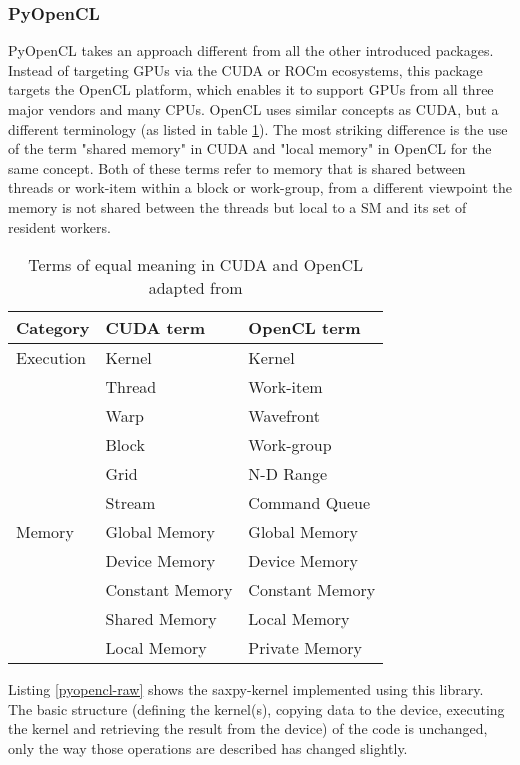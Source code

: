 \documentclass[english,11pt,a4paper,table]{article} %
\begin{document}
\subsubsection{PyOpenCL}

PyOpenCL takes an approach different from all the other introduced packages.
Instead of targeting GPUs via the CUDA or ROCm ecosystems, this package targets the OpenCL platform, which enables it to support GPUs from all three major vendors and many CPUs.
OpenCL uses similar concepts as CUDA, but a different terminology (as listed in table \ref{CUDA-OPENCL-Terminoloy}).
The most striking difference is the use of the term "shared memory" in CUDA and "local memory" in OpenCL for the same concept.
Both of these terms refer to memory that is shared between threads or work-item within a block or work-group, from a different viewpoint the memory is not shared between the threads but local to a SM and its set of resident workers.

\begin{table}[H]
	\centering
	\begin{tabular}{l|ll} \toprule
		Category  & CUDA term       & OpenCL term     \\ \midrule
		Execution & Kernel          & Kernel          \\
		{}        & Thread          & Work-item       \\
		{}        & Warp            & Wavefront       \\
		{}        & Block           & Work-group      \\
		{}        & Grid            & N-D Range       \\
		{}        & Stream          & Command Queue   \\ \midrule
		Memory    & Global Memory   & Global Memory   \\
		{}        & Device Memory   & Device Memory   \\
		{}        & Constant Memory & Constant Memory \\
		{}        & Shared Memory   & Local Memory    \\
		{}        & Local Memory    & Private Memory  \\
		\bottomrule
	\end{tabular}
	\caption{Terms of equal meaning in CUDA and OpenCL adapted from \cite{HARVEY20111093}}
	\label{CUDA-OPENCL-Terminoloy}
\end{table}

Listing \ref{pyopencl-raw} shows the saxpy-kernel implemented using this library.
The basic structure (defining the kernel(s), copying data to the device, executing the kernel and retrieving the result from the device) of the code is unchanged, only the way those operations are described has changed slightly.
\end{document}
